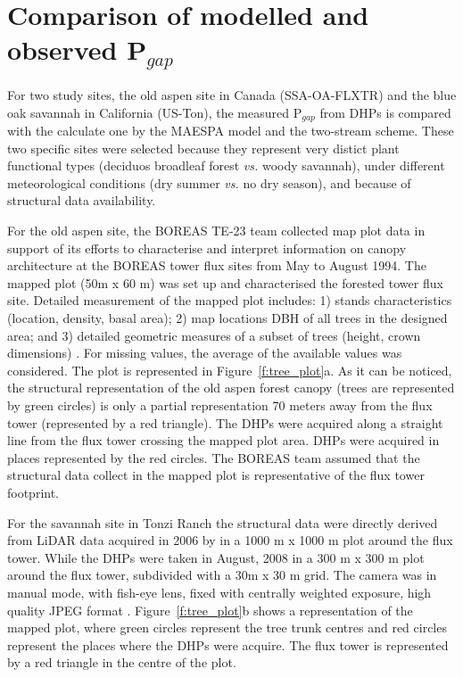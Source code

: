 \section{Comparison of modelled and observed P$_{gap}$}\label{section:MAESPA_build}

For two study sites, the old aspen site in Canada (SSA-OA-FLXTR) and the blue oak savannah in California (US-Ton), the measured P$_{gap}$ from DHPs is compared with the calculate one by the MAESPA model and the two-stream scheme. These two specific sites were selected because they represent very distict plant functional types (deciduos broadleaf forest \textit{vs.} woody savannah), under different meteorological conditions (dry summer \textit{vs.} no dry season), and because of structural data availability. 

For the old aspen site, the BOREAS TE-23 team collected map plot data in support of its efforts to characterise and interpret information on canopy architecture at the BOREAS tower flux sites from May to August 1994. The mapped plot (50m x 60 m) was set up and characterised the forested tower flux site. Detailed measurement of the mapped plot includes: 1) stands characteristics (location, density, basal area); 2) map locations DBH of all trees in the designed area; and 3) detailed geometric measures of a subset of trees (height, crown dimensions) \citep{Rich1999b}. For missing values, the average of the available values was considered. The plot is represented in Figure~\ref{f:tree_plot}a. As it can be noticed, the structural representation of the old aspen forest canopy (trees are represented by green circles) is only a partial representation 70 meters away from the flux tower (represented by a red triangle). The DHPs were acquired along a straight line from the flux tower crossing the mapped plot area. DHPs were acquired in places represented by the red circles. The BOREAS team assumed that the structural data collect in the mapped plot is representative of the flux tower footprint.

For the savannah site in Tonzi Ranch the structural data were directly derived from LiDAR data acquired in 2006 by \citep{Chen2006} in a 1000 m x 1000 m plot around the flux tower. While the DHPs were taken in August, 2008 in a 300 m x 300 m plot around the flux tower, subdivided with a 30m x 30 m grid. The camera was in manual mode, with fish-eye lens, fixed with centrally weighted exposure, high quality JPEG format \citep{Ryu2010}. Figure~\ref{f:tree_plot}b shows a representation of the mapped plot, where green circles represent the tree trunk centres and red circles represent the places where the DHPs were acquire. The flux tower is represented by a red triangle in the centre of the plot.

